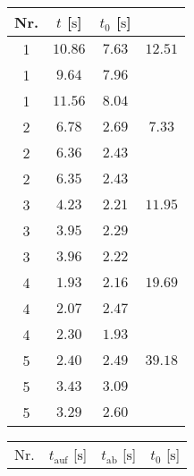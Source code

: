 \begin{table}[H]
   \begin{minipage}[t]{0.5\linewidth}
       \begin{center}
           \captionsetup{width=0.9\linewidth}
           \begin{tabular}{cccc}
               \toprule
               {Nr.} & {$t$ [$\si{\second}$]} & {$t_0$ [$\si{\second}$]}\\
               \midrule
                1 & $10.86$ & $7.63$ & $12.51$ \\
                1 & $ 9.64$ & $7.96$ &         \\
                1 & $11.56$ & $8.04$ &         \\
                2 & $ 6.78$ & $2.69$ & $7.33$ \\
                2 & $ 6.36$ & $2.43$ &         \\
                2 & $ 6.35$ & $2.43$ &         \\
                3 & $ 4.23$ & $2.21$ & $11.95$ \\
                3 & $ 3.95$ & $2.29$ &         \\
                3 & $ 3.96$ & $2.22$ &         \\
                4 & $ 1.93$ & $2.16$ & $19.69$ \\
                4 & $ 2.07$ & $2.47$ &         \\
                4 & $ 2.30$ & $1.93$ &         \\
                5 & $ 2.40$ & $2.49$ & $39.18$ \\
                5 & $ 3.43$ & $3.09$ &         \\
                5 & $ 3.29$ & $2.60$ &         \\
               \bottomrule
           \end{tabular}
           \label{tab:200V}
       \end{center}
   \end{minipage}
   \hfill
   \begin{minipage}[t]{0.5\linewidth}
       \begin{center}
           \captionsetup{width=0.9\linewidth}
           \begin{tabular}{cccc}
               \toprule
               {Nr.} & {$t_{\mathup{auf}}$ [$\si{\second}$]} & {$t_{\mathup{ab}}$ [$\si{\second}$]} & {$t_0$ [$\si{\second}$]}\\

\end{tabular}
\end{center}
\end{minipage}
\end{table}
